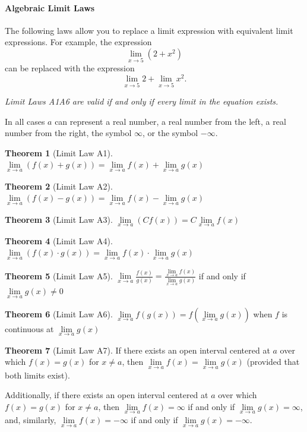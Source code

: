 \documentclass[10pt,oneside,]{book}
\theoremstyle{plain}
\theoremstyle{definition}
\numberwithin{equation}{section}
\newtheorem*{theorem*}{Theorem}
\newcommand{\fe}[2]{#1\mathopen{}\left(#2\right)\mathclose{}}
\begin{document}
\paragraph[Algebraic Limit Laws]{Algebraic Limit Laws}\label{paragraphs-76}
The following laws allow you to replace a limit expression with equivalent limit expressions. For example, the expression \[\lim\limits_{x\to5}\left(2+x^2\right)\] can be replaced with the expression \[\lim\limits_{x\to5}2+\lim\limits_{x\to5}x^2\text{.}\]%
\par
\emph{Limit Laws A1\textendash{}A6 are valid if and only if every limit in the equation exists.}%
\par
In all cases \(a\) can represent a real number, a real number from the left, a real number from the right, the symbol \(\infty\), or the symbol \(-\infty\).%
\begin{theorem*}[Limit Law A1]\label{lla1}
\(\lim\limits_{x\to a}\left(\fe{f}{x}+\fe{g}{x}\right)=\lim\limits_{x\to a}\fe{f}{x}+\lim\limits_{x\to a}\fe{g}{x}\)%
\end{theorem*}
\begin{theorem*}[Limit Law A2]\label{lla2}
\(\lim\limits_{x\to a}\left(\fe{f}{x}-\fe{g}{x}\right)=\lim\limits_{x\to a}\fe{f}{x}-\lim\limits_{x\to a}\fe{g}{x}\)%
\end{theorem*}
\begin{theorem*}[Limit Law A3]\label{lla3}
\(\lim\limits_{x\to a}\left(C\fe{f}{x}\right)=C\lim\limits_{x\to a}\fe{f}{x}\)%
\end{theorem*}
\begin{theorem*}[Limit Law A4]\label{lla4}
\(\lim\limits_{x\to a}\left(\fe{f}{x}\cdot\fe{g}{x}\right)=\lim\limits_{x\to a}\fe{f}{x}\cdot\lim\limits_{x\to a}\fe{g}{x}\)%
\end{theorem*}
\begin{theorem*}[Limit Law A5]\label{lla5}
\(\lim\limits_{x\to a}\frac{\fe{f}{x}}{\fe{g}{x}}=\frac{\lim\limits_{x\to a}\fe{f}{x}}{\lim\limits_{x\to a}\fe{g}{x}}\) if and only if \(\lim\limits_{x\to a}\fe{g}{x}\neq0\)%
\end{theorem*}
\begin{theorem*}[Limit Law A6]\label{lla6}
\(\lim\limits_{x\to a}\fe{f}{\fe{g}{x}}=\fe{f}{\lim\limits_{x\to a}\fe{g}{x}}\) when \(f\) is continuous at \(\lim\limits_{x\to a}\fe{g}{x}\)%
\end{theorem*}
\begin{theorem*}[Limit Law A7]\label{lla7}
If there exists an open interval centered at \(a\) over which \(\fe{f}{x}=\fe{g}{x}\) for \(x\neq a\), then \(\lim\limits_{x\to a}\fe{f}{x}=\lim\limits_{x\to a}\fe{g}{x}\) (provided that both limits exist).%
\par
Additionally, if there exists an open interval centered at \(a\) over which \(\fe{f}{x}=\fe{g}{x}\) for \(x\neq a\), then \(\lim\limits_{x\to a}\fe{f}{x}=\infty\) if and only if \(\lim\limits_{x\to a}\fe{g}{x}=\infty\), and, similarly, \(\lim\limits_{x\to a}\fe{f}{x}=-\infty\) if and only if \(\lim\limits_{x\to a}\fe{g}{x}=-\infty\).%
\end{theorem*}
\typeout{************************************************}
\typeout{************************************************}
\end{document}
